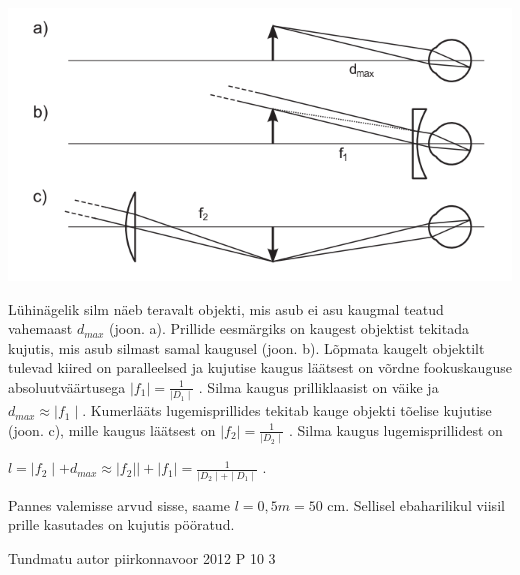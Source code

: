 \documentclass[11pt]{article}
\begin{document}
{{\ifSolution
\begin{center}
	\includegraphics[width=0.5\linewidth]{2011-v3p-08-lah.PNG}
\end{center}
Lühinägelik silm näeb teravalt objekti, mis asub ei asu kaugmal teatud vahemaast $d_{max}$ (joon. a). Prillide eesmärgiks on kaugest objektist tekitada kujutis, mis asub silmast samal kaugusel (joon. b). Lõpmata kaugelt objektilt tulevad kiired on paralleelsed ja kujutise kaugus läätsest on võrdne fookuskauguse absoluutväärtusega $\mid f_1 \mid = \frac{1}{\mid D_1 \mid}$ . Silma kaugus prilliklaasist on väike ja $d_{max} \approx \mid f_1 \mid$. Kumerlääts lugemisprillides tekitab kauge objekti tõelise kujutise (joon. c), mille kaugus läätsest on $\mid f_2 \mid = \frac{1}{\mid D_2 \mid}$ . Silma kaugus lugemisprillidest on 
\begin{center}
$l = \mid f_2 \mid + d_{max} \approx \mid f_2| \mid + \mid f_1 \mid = \frac{1}{\mid D_2 \mid + \mid D_1 \mid}$ .
\end{center}
Pannes valemisse arvud sisse, saame $l = 0,5 m = 50$ cm. Sellisel ebaharilikul viisil prille kasutades on kujutis pööratud.
\fi
}


{Tundmatu autor} %
{piirkonnavoor} %
{2012} %
{P 10} %
{3} %
{

}}
\end{document}

